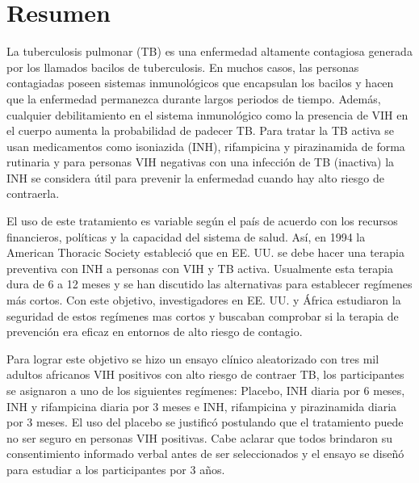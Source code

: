 \section*{Resumen}

La tuberculosis pulmonar (TB) es una enfermedad altamente contagiosa generada por los llamados bacilos de tuberculosis. En muchos casos, las personas contagiadas poseen sistemas inmunológicos que encapsulan los bacilos y hacen que la enfermedad permanezca durante largos periodos de tiempo. Además, cualquier debilitamiento en el sistema inmunológico como la presencia de VIH en el cuerpo aumenta la probabilidad de padecer TB. Para tratar la TB activa se usan medicamentos como isoniazida (INH), rifampicina y pirazinamida de forma rutinaria y para personas VIH negativas con una infección de TB (inactiva) la INH se considera útil para prevenir la enfermedad cuando hay alto riesgo de contraerla.

El uso de este tratamiento es variable según el país de acuerdo con los recursos financieros, políticas y la capacidad del sistema de salud. Así, en 1994 la American Thoracic Society estableció que en EE. UU. se debe hacer una terapia preventiva con INH a personas con VIH y TB activa. Usualmente esta terapia dura de 6 a 12 meses y se han discutido las alternativas para establecer regímenes más cortos. Con este objetivo, investigadores en EE. UU. y África estudiaron la seguridad de estos regímenes mas cortos y buscaban comprobar si la terapia de prevención era eficaz en entornos de alto riesgo de contagio.

Para lograr este objetivo se hizo un ensayo clínico aleatorizado con tres mil adultos africanos VIH positivos con alto riesgo de contraer TB, los participantes se asignaron a uno de los siguientes regímenes: Placebo, INH diaria por 6 meses, INH y rifampicina diaria por 3 meses e INH, rifampicina y pirazinamida diaria por 3 meses. El uso del placebo se justificó postulando que el tratamiento puede no ser seguro en personas VIH positivas. Cabe aclarar que todos brindaron su consentimiento informado verbal antes de ser seleccionados y el ensayo se diseñó para estudiar a los participantes por 3 años.

